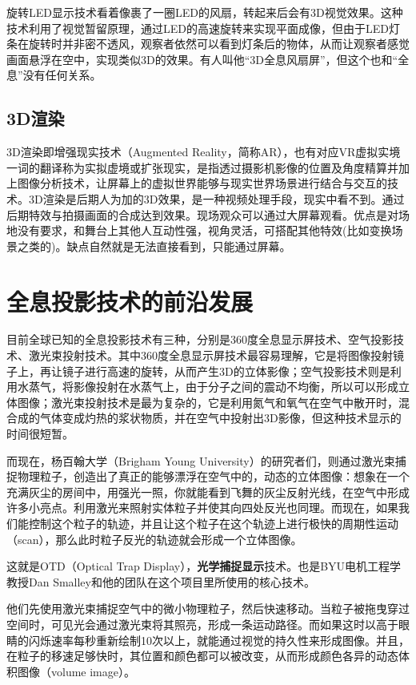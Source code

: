 \documentclass[UTF8]{ctexart}
\begin{document}
旋转LED显示技术看着像裹了一圈LED的风扇，转起来后会有3D视觉效果。这种技术利用了视觉暂留原理，通过LED的高速旋转来实现平面成像，但由于LED灯条在旋转时并非密不透风，观察者依然可以看到灯条后的物体，从而让观察者感觉画面悬浮在空中，实现类似3D的效果。有人叫他“3D全息风扇屏”，但这个也和“全息”没有任何关系。

\subsection{3D渲染}

3D渲染即增强现实技术（Augmented Reality，简称AR），也有对应VR虚拟实境一词的翻译称为实拟虚境或扩张现实，是指透过摄影机影像的位置及角度精算并加上图像分析技术，让屏幕上的虚拟世界能够与现实世界场景进行结合与交互的技术。3D渲染是后期人为加的3D效果，是一种视频处理手段，现实中看不到。通过后期特效与拍摄画面的合成达到效果。现场观众可以通过大屏幕观看。优点是对场地没有要求，和舞台上其他人互动性强，视角灵活，可搭配其他特效(比如变换场景之类的)。缺点自然就是无法直接看到，只能通过屏幕。


\section{全息投影技术的前沿发展}

目前全球已知的全息投影技术有三种，分别是360度全息显示屏技术、空气投影技术、激光束投射技术。其中360度全息显示屏技术最容易理解，它是将图像投射镜子上，再让镜子进行高速的旋转，从而产生3D的立体影像；空气投影技术则是利用水蒸气，将影像投射在水蒸气上，由于分子之间的震动不均衡，所以可以形成立体图像；激光束投射技术是最为复杂的，它是利用氮气和氧气在空气中散开时，混合成的气体变成灼热的浆状物质，并在空气中投射出3D影像，但这种技术显示的时间很短暂。

而现在，杨百翰大学（Brigham Young University）的研究者们，则通过激光束捕捉物理粒子，创造出了真正的能够漂浮在空气中的，动态的立体图像：想象在一个充满灰尘的房间中，用强光一照，你就能看到飞舞的灰尘反射光线，在空气中形成许多小亮点。利用激光来照射实体粒子并使其向四处反光也同理。而现在，如果我们能控制这个粒子的轨迹，并且让这个粒子在这个轨迹上进行极快的周期性运动（scan），那么此时粒子反光的轨迹就会形成一个立体图像。

这就是OTD（Optical Trap Display），\textbf{光学捕捉显示}技术。也是BYU电机工程学教授Dan Smalley和他的团队在这个项目里所使用的核心技术。

他们先使用激光束捕捉空气中的微小物理粒子，然后快速移动。当粒子被拖曳穿过空间时，可见光会通过激光束将其照亮，形成一条运动路径。而如果这时以高于眼睛的闪烁速率每秒重新绘制10次以上，就能通过视觉的持久性来形成图像。并且，在粒子的移速足够快时，其位置和颜色都可以被改变，从而形成颜色各异的动态体积图像（volume image）。
\end{document}
